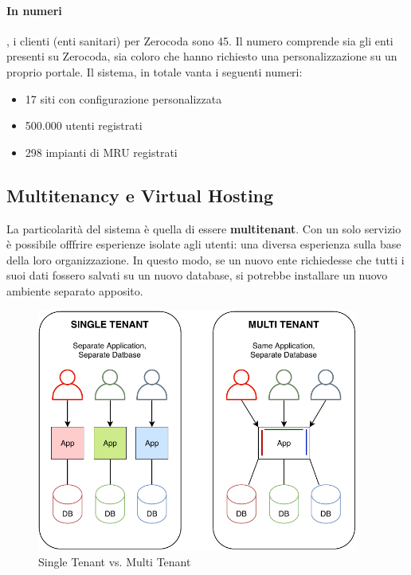 \paragraph{In numeri}, i clienti (enti sanitari) per Zerocoda sono 45. Il numero comprende sia gli enti presenti su Zerocoda, sia coloro che hanno richiesto una personalizzazione su un proprio portale. Il sistema, in totale vanta i seguenti numeri:
\begin{itemize}
    \item 17 siti con configurazione personalizzata
    \item 500.000 utenti registrati
    \item 298 impianti di MRU registrati
\end{itemize}


\subsection{Multitenancy e Virtual Hosting}
La particolarità del sistema è quella di essere \textbf{multitenant}. Con un solo servizio è possibile offfrire esperienze isolate agli utenti: una diversa esperienza sulla base della loro organizzazione. In questo modo, se un nuovo ente richiedesse che tutti i suoi dati fossero salvati su un nuovo database, si potrebbe installare un nuovo ambiente separato apposito.
\begin{figure}[H]
    \centering
    \includegraphics[width=0.94\textwidth]{images/02_3_multitenancy.pdf}
    \caption{Single Tenant vs. Multi Tenant}
    \label{fig:multitenancy}
\end{figure}

